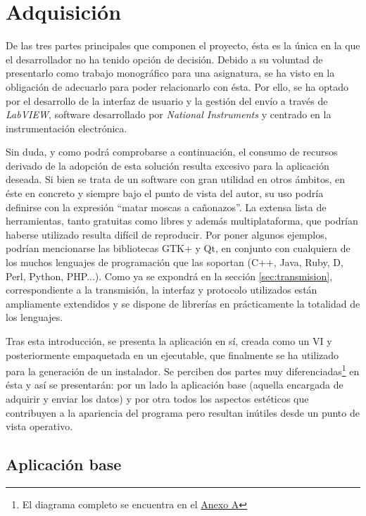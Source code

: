 \section{Adquisición}
\label{sec:adquisicion}

De las tres partes principales que componen el proyecto, ésta es la única en la que el desarrollador no ha tenido opción de decisión. Debido a su voluntad de presentarlo como trabajo monográfico para una asignatura, se ha visto en la obligación de adecuarlo para poder relacionarlo con ésta. Por ello, se ha optado por el desarrollo de la interfaz de usuario y la gestión del envío a través de \textit{LabVIEW}\cite{labview}, software desarrollado por \textit{National Instruments}\cite{ni} y centrado en la instrumentación electrónica.

Sin duda, y como podrá comprobarse a continuación, el consumo de recursos derivado de la adopción de esta solución resulta excesivo para la aplicación deseada. Si bien se trata de un software con gran utilidad en otros ámbitos, en éste en concreto y siempre bajo el punto de vista del autor, su uso podría definirse con la expresión ``matar moscas a cañonazos''. La extensa lista de herramientas, tanto gratuitas como libres y además multiplataforma, que podrían haberse utilizado resulta difícil de reproducir. Por poner algunos ejemplos, podrían mencionarse las bibliotecas GTK+\cite{gtk} y Qt\cite{qt}, en conjunto con cualquiera de los muchos lenguajes de programación que las soportan (C++, Java, Ruby, D, Perl, Python, PHP...). Como ya se expondrá en la sección \ref{sec:transmision}, correspondiente a la transmisión, la interfaz y protocolo utilizados están ampliamente extendidos y se dispone de librerías en prácticamente la totalidad de los lenguajes.

Tras esta introducción, se presenta la aplicación en sí, creada como un VI y posteriormente empaquetada en un ejecutable, que finalmente se ha utilizado para la generación de un instalador. Se perciben dos partes muy diferenciadas\footnote{El diagrama completo se encuentra en el \hyperref[anexoa]{Anexo A}} en ésta y así se presentarán: por un lado la aplicación base (aquella encargada de adquirir y enviar los datos) y por otra todos los aspectos estéticos que contribuyen a la apariencia del programa pero resultan inútiles desde un punto de vista operativo.

\subsection{Aplicación base}

